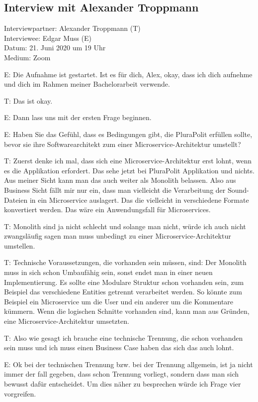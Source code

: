 \subsection{Interview mit Alexander Troppmann}
\label{appendix:troppmann}

Interviewpartner: Alexander Troppmann (T) \\
Interviewee: Edgar Muss (E) \\
Datum: 21. Juni 2020 um 19 Uhr \\
Medium: Zoom

E: Die Aufnahme ist gestartet. Ist es für dich, Alex, okay, dass ich dich aufnehme und dich im Rahmen meiner Bachelorarbeit verwende.

T: Das ist okay.

E: Dann lass uns mit der ersten Frage beginnen.

E: Haben Sie das Gefühl, dass es Bedingungen gibt, die PluraPolit erfüllen sollte, bevor sie ihre Softwarearchitekt zum einer Microservice-Architektur umstellt? 

T: Zuerst denke ich mal, dass sich eine Microservice-Architektur erst lohnt, wenn es die Applikation erfordert. Das sehe jetzt bei PluraPolit Applikation und nichts. Aus meiner Sicht kann man das auch weiter als Monolith belassen.  Also aus Business Sicht fällt mir nur ein,  dass man vielleicht die Verarbeitung der Sound-Dateien in ein Microservice auslagert. Das die vielleicht in verschiedene Formate konvertiert werden. Das wäre ein Anwendungsfall für Microservices. 

T: Monolith sind ja nicht schlecht und solange man nicht, würde ich auch nicht zwangsläufig sagen man muss unbedingt zu einer Microservice-Architektur umstellen.

T: Technische Voraussetzungen, die vorhanden sein müssen, sind: Der Monolith muss in sich schon Umbaufähig sein, sonst endet man in einer neuen Implementierung. Es sollte eine Modulare Struktur schon vorhanden sein, zum Beispiel das verschiedene Entities getrennt verarbeitet werden. So könnte zum Beispiel ein Microservice um die User und ein anderer um  die Kommentare kümmern. Wenn die logischen Schnitte vorhanden sind, kann man aus Gründen, eine Microservice-Architektur umsetzten. 

\label{appendix:t-1} \label{appendix:t-2}
T: Also wie gesagt ich brauche eine technische Trennung, die schon vorhanden sein muss und ich muss einen Business Case haben das sich das auch lohnt.

E: Ok bei der technischen Trennung bzw. bei der Trennung allgemein, ist ja nicht immer der fall gegeben, dass schon Trennung vorliegt, sondern dass man sich bewusst dafür entscheidet. Um dies näher zu besprechen würde ich Frage vier vorgreifen.

